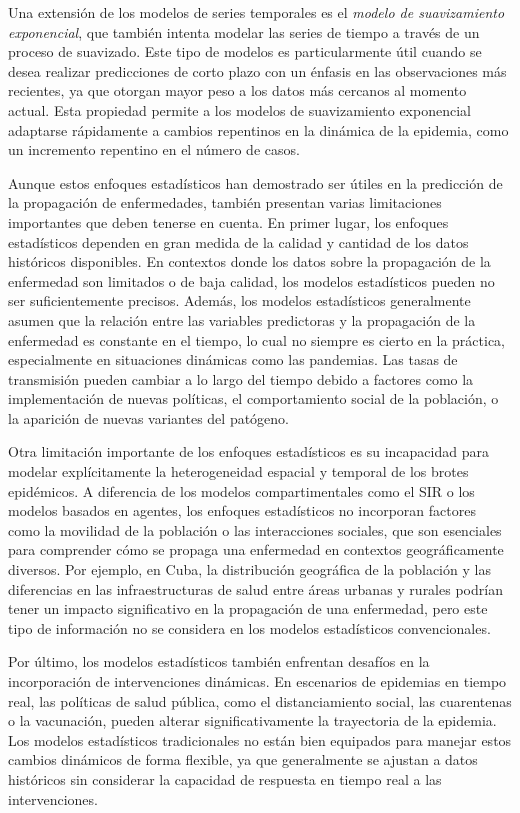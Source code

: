 Una extensión de los modelos de series temporales es el \textit{modelo de suavizamiento exponencial}, que también intenta modelar las series de tiempo a través de un proceso de suavizado. Este tipo de modelos es particularmente útil cuando se desea realizar predicciones de corto plazo con un énfasis en las observaciones más recientes, ya que otorgan mayor peso a los datos más cercanos al momento actual. Esta propiedad permite a los modelos de suavizamiento exponencial adaptarse rápidamente a cambios repentinos en la dinámica de la epidemia, como un incremento repentino en el número de casos.

Aunque estos enfoques estadísticos han demostrado ser útiles en la predicción de la propagación de enfermedades, también presentan varias limitaciones importantes que deben tenerse en cuenta. En primer lugar, los enfoques estadísticos dependen en gran medida de la calidad y cantidad de los datos históricos disponibles. En contextos donde los datos sobre la propagación de la enfermedad son limitados o de baja calidad, los modelos estadísticos pueden no ser suficientemente precisos. Además, los modelos estadísticos generalmente asumen que la relación entre las variables predictoras y la propagación de la enfermedad es constante en el tiempo, lo cual no siempre es cierto en la práctica, especialmente en situaciones dinámicas como las pandemias. Las tasas de transmisión pueden cambiar a lo largo del tiempo debido a factores como la implementación de nuevas políticas, el comportamiento social de la población, o la aparición de nuevas variantes del patógeno.

Otra limitación importante de los enfoques estadísticos es su incapacidad para modelar explícitamente la heterogeneidad espacial y temporal de los brotes epidémicos. A diferencia de los modelos compartimentales como el SIR o los modelos basados en agentes, los enfoques estadísticos no incorporan factores como la movilidad de la población o las interacciones sociales, que son esenciales para comprender cómo se propaga una enfermedad en contextos geográficamente diversos. Por ejemplo, en Cuba, la distribución geográfica de la población y las diferencias en las infraestructuras de salud entre áreas urbanas y rurales podrían tener un impacto significativo en la propagación de una enfermedad, pero este tipo de información no se considera en los modelos estadísticos convencionales.

Por último, los modelos estadísticos también enfrentan desafíos en la incorporación de intervenciones dinámicas. En escenarios de epidemias en tiempo real, las políticas de salud pública, como el distanciamiento social, las cuarentenas o la vacunación, pueden alterar significativamente la trayectoria de la epidemia. Los modelos estadísticos tradicionales no están bien equipados para manejar estos cambios dinámicos de forma flexible, ya que generalmente se ajustan a datos históricos sin considerar la capacidad de respuesta en tiempo real a las intervenciones.

